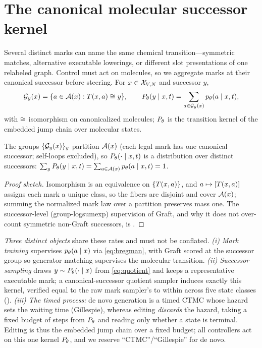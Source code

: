 \section{The canonical molecular successor kernel}
\label{sec:kernel}

Several distinct marks can name the same chemical transition---symmetric matches, alternative executable
lowerings, or different slot presentations of one relabeled graph. Control must act on molecules, so we
aggregate marks at their canonical successor before steering. For $x\in\mathcal{X}_{V,N}$ and successor $y$,
\begin{equation}
\mathcal{G}_{y}(x)=\{a\in\mathcal{A}(x):T(x,a)\cong y\},\qquad
P_\theta(y\mid x,t)=\sum_{a\in\mathcal{G}_{y}(x)}p_\theta(a\mid x,t),
\label{eq:quotient}
\end{equation}
with $\cong$ isomorphism on canonicalized molecules; $P_\theta$ is the transition kernel of the embedded
jump chain over molecular states.

\begin{proposition}
\label{prop:kernel}
The groups $\{\mathcal{G}_{y}(x)\}_y$ partition $\mathcal{A}(x)$ (each legal mark has one canonical successor; self-loops
excluded), so $P_\theta(\cdot\mid x,t)$ is a distribution over distinct successors:
$\sum_yP_\theta(y\mid x,t)=\sum_{a\in\mathcal{A}(x)}p_\theta(a\mid x,t)=1$.
\end{proposition}
\begin{proof}[Proof sketch]
Isomorphism is an equivalence on $\{T(x,a)\}$, and $a\mapsto[T(x,a)]$ assigns each mark a unique
class, so the fibers are disjoint and cover $\mathcal{A}(x)$; summing the normalized mark law over a partition
preserves mass one. The successor-level (group-logsumexp) supervision of Graft, and why it does not
over-count symmetric non-Graft successors, is .
\end{proof}

\emph{Three distinct objects} share these rates and must not be conflated. \emph{(i) Mark training}
supervises $p_\theta(a\mid x)$ via \eqref{eq:bregman}, with Graft scored at the successor group so generator
matching supervises the molecular transition. \emph{(ii) Successor sampling} draws
$y\sim P_\theta(\cdot\mid x)$ from \eqref{eq:quotient} and keeps a representative executable mark; a
canonical-successor quotient sampler induces exactly this kernel, verified equal to the raw mark sampler's
to within  across five state classes (). \emph{(iii)
The timed process:} de novo generation is a timed CTMC whose hazard sets the waiting time (Gillespie),
whereas editing \emph{discards} the hazard, taking a fixed budget of steps from $P_\theta$ and reading only
whether a state is terminal. Editing is thus the embedded jump chain over a fixed budget; all controllers
act on this one kernel $P_\theta$, and we reserve ``CTMC''/``Gillespie'' for de novo.
